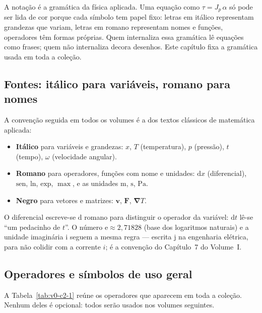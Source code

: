 \documentclass[12pt,a4paper]{article}
\numberwithin{equation}{section}
\numberwithin{table}{section}
\numberwithin{figure}{section}
\begin{document}
A notação é a gramática da física aplicada. Uma equação como
$\tau = J_p\,\alpha$ só pode ser lida de cor porque cada símbolo tem papel
fixo: letras em itálico representam grandezas que variam, letras em romano
representam nomes e funções, operadores têm formas próprias. Quem internaliza
essa gramática lê equações como frases; quem não internaliza decora
desenhos. Este capítulo fixa a gramática usada em toda a coleção.

\subsection{Fontes: itálico para variáveis, romano para nomes}

A convenção seguida em todos os volumes é a dos textos clássicos de
matemática aplicada:

\begin{itemize}
\item \textbf{Itálico} para variáveis e grandezas: $x$, $T$ (temperatura),
$p$ (pressão), $t$ (tempo), $\omega$ (velocidade angular).
\item \textbf{Romano} para operadores, funções com nome e unidades:
$\mathrm{d}x$ (diferencial), $\mathrm{sen}$, $\mathrm{ln}$, $\mathrm{exp}$,
$\max$, e as unidades $\mathrm{m}$, $\mathrm{s}$, $\mathrm{Pa}$.
\item \textbf{Negro} para vetores e matrizes: $\bm{v}$, $\bm{F}$,
$\bm{\nabla}T$.
\end{itemize}

O diferencial escreve-se $\mathrm{d}$ romano para distinguir o operador da
variável: $\mathrm{d}t$ lê-se ``um pedacinho de $t$''. O número
$\mathrm{e} \approx 2{,}71828$ (base dos logaritmos naturais) e a unidade
imaginária $\mathrm{i}$ seguem a mesma regra --- escrita $\mathrm{j}$ na
engenharia elétrica, para não colidir com a corrente $i$; é a convenção do
Capítulo~7 do Volume~I.

\subsection{Operadores e símbolos de uso geral}

A Tabela~\ref{tab:v0-c2-1} reúne os operadores que aparecem em toda a
coleção. Nenhum deles é opcional: todos serão usados nos volumes seguintes.
\end{document}

